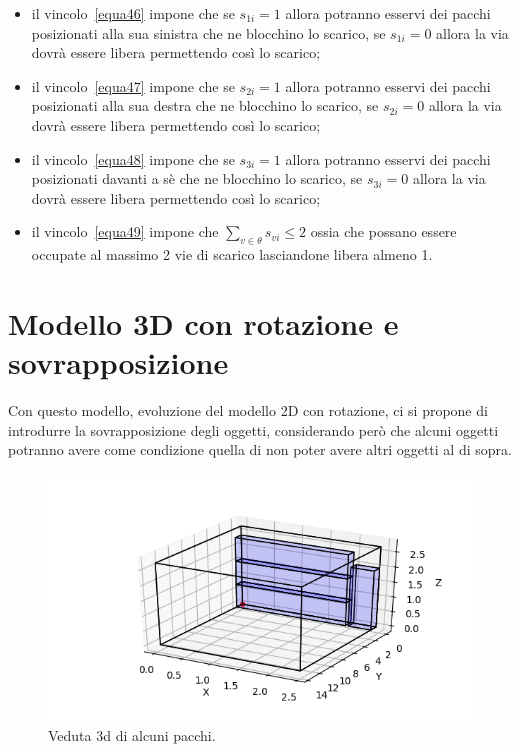 \begin{itemize}
	\item il vincolo~\eqref{equa46} impone che se $s_{1i} = 1$ allora potranno esservi dei pacchi posizionati alla sua sinistra che ne blocchino lo scarico, se $s_{1i} = 0$ allora la via dovrà essere libera permettendo così lo scarico;
	\item il vincolo~\eqref{equa47} impone che se $s_{2i} = 1$ allora potranno esservi dei pacchi posizionati alla sua destra che ne blocchino lo scarico, se $s_{2i} = 0$ allora la via dovrà essere libera permettendo così lo scarico;
	\item il vincolo~\eqref{equa48} impone che se $s_{3i} = 1$ allora potranno esservi dei pacchi posizionati davanti a sè che ne blocchino lo scarico, se $s_{3i} = 0$ allora la via dovrà essere libera permettendo così lo scarico;
	\item il vincolo~\eqref{equa49} impone che $\sum_{v \in \theta} s_{vi} \leq 2$ ossia che possano essere occupate al massimo 2 vie di scarico lasciandone libera almeno 1.
\end{itemize}

\newpage
\section{Modello 3D con rotazione e sovrapposizione}
Con questo modello, evoluzione del modello 2D con rotazione, ci si propone di introdurre la sovrapposizione degli oggetti, considerando però che alcuni oggetti potranno avere come condizione quella di non poter avere altri oggetti al di sopra.

\begin{figure}[H]
	\begin{center} \includegraphics[scale=0.7]{figures/3d}
		\caption[ciucia]{Veduta 3d di alcuni pacchi.}
		\label{fig:3d_grafics}
	\end{center}
\end{figure}

